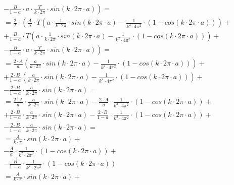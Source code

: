\begin{task}
\begin{align*}
&-\left. \frac{B}{1-a}\cdot a \cdot \frac{T}{k \cdot 2\pi} \cdot sin\left(k \cdot 2\pi \cdot a\right) \right)=\\
&=\frac{2}{T}\cdot\left( \frac{A}{a} \cdot T \left( a \cdot \frac{1}{k \cdot 2\pi} \cdot sin\left( k \cdot 2\pi \cdot a\right) - \frac{1}{k^2 \cdot 4\pi^2} \cdot \left(1 -cos\left(k \cdot 2\pi \cdot a \right)\right) \right) \right. + \\
&+\left.\frac{B}{1-a}\cdot T \left(a \cdot \frac{1}{k \cdot 2\pi} \cdot sin\left( k \cdot 2\pi \cdot a \right) - \frac{1}{k^2 \cdot 4\pi^2} \cdot \left(1 - cos\left( k \cdot 2\pi \cdot a \right) \right)  \right)\right. +\\
&-\left. \frac{B}{1-a}\cdot a \cdot \frac{T}{k \cdot 2\pi} \cdot sin\left(k \cdot 2\pi \cdot a\right) \right)=\\
&= \frac{2\cdot A}{a} \left( \frac{a}{k \cdot 2\pi} \cdot sin\left( k \cdot 2\pi \cdot a\right) - \frac{1}{k^2 \cdot 4\pi^2} \cdot \left(1 -cos\left(k \cdot 2\pi \cdot a \right)\right) \right) + \\
&+\frac{2 \cdot B}{1-a} \left(\frac{a}{k \cdot 2\pi} \cdot sin\left( k \cdot 2\pi \cdot a \right) - \frac{1}{k^2 \cdot 4\pi^2} \cdot \left(1 - cos\left( k \cdot 2\pi \cdot a \right) \right)  \right) +\\
&- \frac{2\cdot B}{1-a}\cdot \frac{a}{k \cdot 2\pi} \cdot sin\left(k \cdot 2\pi \cdot a\right)=\\
&= \frac{2\cdot A}{a} \cdot \frac{a}{k \cdot 2\pi} \cdot sin\left( k \cdot 2\pi \cdot a\right) - \frac{2\cdot A}{a}  \cdot \frac{1}{k^2 \cdot 4\pi^2} \cdot \left(1 -cos\left(k \cdot 2\pi \cdot a \right)\right) + \\
&+\frac{2 \cdot B}{1-a} \cdot \frac{a}{k \cdot 2\pi} \cdot sin\left( k \cdot 2\pi \cdot a \right) - \frac{2 \cdot B}{1-a} \cdot \frac{1}{k^2 \cdot 4\pi^2} \cdot \left(1 - cos\left( k \cdot 2\pi \cdot a \right) \right) +\\
&- \frac{2\cdot B}{1-a}\cdot \frac{a}{k \cdot 2\pi} \cdot sin\left(k \cdot 2\pi \cdot a\right)=\\
&= \frac{A}{k \cdot \pi} \cdot sin\left( k \cdot 2\pi \cdot a\right) + \\
& - \frac{A}{a}  \cdot \frac{1}{k^2 \cdot 2\pi^2} \cdot \left(1 -cos\left(k \cdot 2\pi \cdot a \right)\right) + \\
& - \frac{B}{1-a} \cdot \frac{1}{k^2 \cdot 2\pi^2} \cdot \left(1 - cos\left( k \cdot 2\pi \cdot a \right) \right)\\
&= \frac{A}{k \cdot \pi} \cdot sin\left( k \cdot 2\pi \cdot a\right) + \\

\end{align*}
\end{task}

